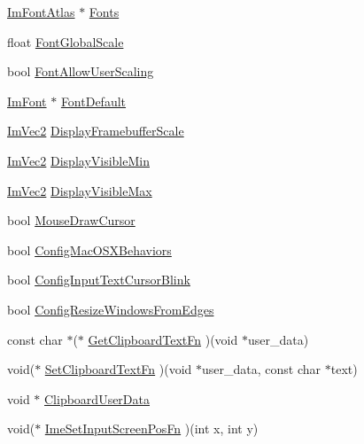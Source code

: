 \begin{DoxyCompactItemize}
\item 
\mbox{\hyperlink{struct_im_font_atlas}{Im\+Font\+Atlas}} $\ast$ \mbox{\hyperlink{struct_im_gui_i_o_a24e4f5201fe8780267abc2acfc24254c}{Fonts}}
\item 
float \mbox{\hyperlink{struct_im_gui_i_o_a74a64a74dcbe2a6ef0c1ef56ba328094}{Font\+Global\+Scale}}
\item 
bool \mbox{\hyperlink{struct_im_gui_i_o_af5fc6eae7ce68cce8473f006431f530e}{Font\+Allow\+User\+Scaling}}
\item 
\mbox{\hyperlink{struct_im_font}{Im\+Font}} $\ast$ \mbox{\hyperlink{struct_im_gui_i_o_a11016e4aefa603523bce61315b66bf00}{Font\+Default}}
\item 
\mbox{\hyperlink{struct_im_vec2}{Im\+Vec2}} \mbox{\hyperlink{struct_im_gui_i_o_a703cad6bd4c9e8972d056116104d27e8}{Display\+Framebuffer\+Scale}}
\item 
\mbox{\hyperlink{struct_im_vec2}{Im\+Vec2}} \mbox{\hyperlink{struct_im_gui_i_o_a45b49309f2f8765622962ed7f286674d}{Display\+Visible\+Min}}
\item 
\mbox{\hyperlink{struct_im_vec2}{Im\+Vec2}} \mbox{\hyperlink{struct_im_gui_i_o_a9bb46e8da3da68b83c66219beb861cb1}{Display\+Visible\+Max}}
\item 
bool \mbox{\hyperlink{struct_im_gui_i_o_a9b240460966bf2bd35c30f27b8db4028}{Mouse\+Draw\+Cursor}}
\item 
bool \mbox{\hyperlink{struct_im_gui_i_o_ab2b62c3ee538d4037e7467bf934fd7a2}{Config\+Mac\+O\+S\+X\+Behaviors}}
\item 
bool \mbox{\hyperlink{struct_im_gui_i_o_ad17e398044a43d0020f692af8a72a9ac}{Config\+Input\+Text\+Cursor\+Blink}}
\item 
bool \mbox{\hyperlink{struct_im_gui_i_o_a2c3fc8374be2956406e0aaa14ae46d22}{Config\+Resize\+Windows\+From\+Edges}}
\item 
const char $\ast$($\ast$ \mbox{\hyperlink{struct_im_gui_i_o_ab7face2b2efef720a22a7fb2143d415c}{Get\+Clipboard\+Text\+Fn}} )(void $\ast$user\+\_\+data)
\item 
void($\ast$ \mbox{\hyperlink{struct_im_gui_i_o_a1ee9c0763df33f7f3a9819235ce85078}{Set\+Clipboard\+Text\+Fn}} )(void $\ast$user\+\_\+data, const char $\ast$text)
\item 
void $\ast$ \mbox{\hyperlink{struct_im_gui_i_o_a162d9da988e8985df05d262640f2f91c}{Clipboard\+User\+Data}}
\item 
void($\ast$ \mbox{\hyperlink{struct_im_gui_i_o_ac59559342608fbdeb14778a4fd57c301}{Ime\+Set\+Input\+Screen\+Pos\+Fn}} )(int x, int y)
\item 

\end{DoxyCompactItemize}
